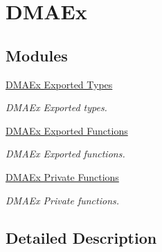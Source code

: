 \hypertarget{group___d_m_a_ex}{}\section{D\+M\+A\+Ex}
\label{group___d_m_a_ex}
\subsection*{Modules}
\begin{DoxyCompactItemize}
\item 
\hyperlink{group___d_m_a_ex___exported___types}{D\+M\+A\+Ex Exported Types}
\begin{DoxyCompactList}\small\item\em D\+M\+A\+Ex Exported types. \end{DoxyCompactList}\item 
\hyperlink{group___d_m_a_ex___exported___functions}{D\+M\+A\+Ex Exported Functions}
\begin{DoxyCompactList}\small\item\em D\+M\+A\+Ex Exported functions. \end{DoxyCompactList}\item 
\hyperlink{group___d_m_a_ex___private___functions}{D\+M\+A\+Ex Private Functions}
\begin{DoxyCompactList}\small\item\em D\+M\+A\+Ex Private functions. \end{DoxyCompactList}\end{DoxyCompactItemize}


\subsection{Detailed Description}
